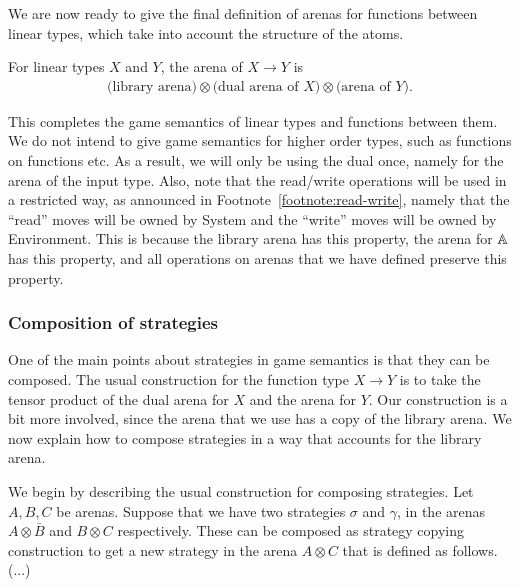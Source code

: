 We are now ready to give the final definition of arenas for functions between linear types, which take into account the structure of the atoms.

\begin{definition} For linear types $X$ and $Y$, the arena of $X \to Y$ is 
    \begin{align*}
    \text{(library arena)} \otimes \text{(dual arena of $X$)} \otimes \text{(arena of $Y$)}.
    \end{align*}
\end{definition}

This completes the game semantics of linear types and functions between them. We do not intend to give game semantics for higher order types, such as functions on functions etc. As a result, we will only be using the dual once, namely for the arena of the input type. Also, note that the read/write operations will be used in a restricted way, as announced in Footnote~\ref{footnote:read-write}, namely that the ``read'' moves will be owned by System and the ``write'' moves will be owned by Environment.  This is because the library arena has this property, the arena for $\mathbb A$ has this property, and all operations on arenas that we have defined preserve this property.

\subsubsection{Composition of strategies}
\label{sec:composition-of-strategies}
One of the main points about strategies in game semantics is that they can be composed. The usual construction for the function type $X \to Y$ is to take the tensor product of the dual arena for $X$ and the arena for $Y$. Our construction is a bit more involved, since the arena that we use has a copy of the library arena. We now explain how to compose strategies in a way that accounts for the library arena. 

We begin by describing the usual construction for composing strategies. 
Let $A, B, C$ be arenas. Suppose that we have two strategies $\sigma$ and $\gamma$, in the arenas $A \otimes \bar B$ and $B \otimes C$ respectively. These can be composed as strategy copying construction to get a new strategy  in the arena $A \otimes C$ that is defined as follows. (...)

